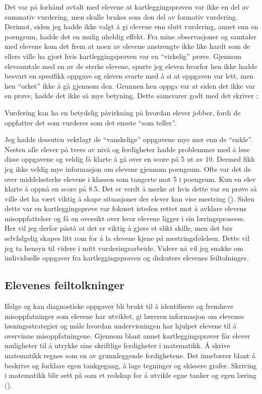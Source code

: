 \documentclass[main.tex]{subfiles}
\begin{document}
Det var på forhånd avtalt med elevene at kartleggingsprøven var ikke en del av summativ vurdering, men skulle brukes
som den del av formativ vurdering. Derimot, siden jeg hadde ikke valgt å gi elevene enn slutt vurdering, annet enn en 
poengsum, hadde det en mulig uheldig effekt. Fra mine observasjoner og samtaler med elevene kom det frem at noen av 
elevene anstrengte ikke like hardt som de ellers ville ha gjort hvis kartleggingsprøven var en ``virkelig'' prøve.
Gjennom elevsamtale med en av de sterke elevene, spurte jeg eleven hvorfor hen ikke hadde besvart en spesifikk 
oppgave og eleven svarte med å si at oppgaven var lett, men hen ``orket'' ikke å gå gjennom den. Grunnen hen oppga 
var at siden det ikke var en prøve, hadde det ikke så mye betyning. Dette samsvarer godt med det  
skriver : 
\begin{displayquote}
Vurdering kan ha en betydelig påvirkning på hvordan elever jobber, fordi de oppfatter det som 
vurderes som det eneste ``som teller''.
\end{displayquote}
Jeg hadde dessuten vektlagt de ``vanskelige'' oppgavene mye mer enn de ``enkle''. Nesten alle elever på tvers av nivå og 
ferdigheter hadde problemmer med å løse disse oppgavene og veldig få klarte å gå over en score på 5 ut av 10. Dermed 
fikk jeg ikke veldig mye informasjon om elevene gjennom poengsum. Ofte var det de over middelssterke elevene i klassen 
som tangerte mot 5 i poengsum. Kun en elev klarte å oppnå en score på 8.5. Det er verdt å merke at hvis dette var 
en prøve så ville det ha vært viktig å skape situasjoner der elever kan vise mestring (). 
Siden dette var en kartleggingsprøve var fokuset isteden rettet mot å avklare elevens misoppfattelser og få en oversikt 
over hvor elevene ligger i sin læringsprossess. Her vil jeg derfor påstå at det er viktig å gjøre et slikt skille, men 
det bør selvfølgelig skapes litt rom for å la elevene kjene på mestringsfølelsen. Dette vil jeg ta hensyn til videre i
mitt vurderingsarbeide. Videre nå vil jeg snakke om individuelle oppgaver fra kartleggingsprøven og diskutere 
elevenes feiltolninger.

\subsection*{Elevenes feiltolkninger}
Ifølge  og  kan diagnostiske oppgaver bli brukt til å identifisere og 
fremheve misoppfatninger som elevene har utviklet, gi læreren informasjon om elevenes løsningsstrategier og måle hvordan 
undervisningen har hjulpet elevene til å overvinne misoppfatningene. Gjennom blant annet kartleggingsprøver får elever 
muligheter til å utrykke sine skriftlige ferdigheter i matematikk. Å skrive matematikk regnes som en av grunnleggende 
ferdighetene. Det innebærer blant å beskrive og forklare egen tankgegang, å lage tegninger og skissere grafer. 
Skriving i matematikk blir sett på som et redskap for å utvikle egne tanker og egen læring (). 
\end{document}
